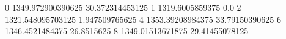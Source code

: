 0 1349.972900390625 30.372314453125
1 1319.6005859375 0.0
2 1321.548095703125 1.947509765625
4 1353.39208984375 33.79150390625
6 1346.4521484375 26.8515625
8 1349.01513671875 29.41455078125
